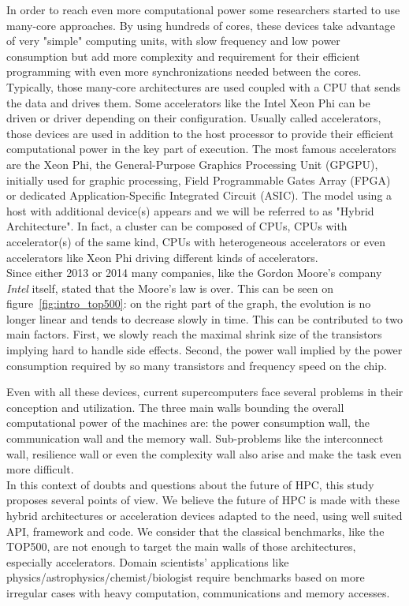 In order to reach even more computational power some researchers started to use many-core approaches. 
By using hundreds of cores, these devices take advantage of very "simple" computing units, with slow frequency and low power consumption but add more complexity and requirement for their efficient programming with even more synchronizations needed between the cores. 
Typically, those many-core architectures are used coupled with a CPU that sends the data and drives them.
Some accelerators like the Intel Xeon Phi can be driven or driver depending on their configuration. 
Usually called accelerators, those devices are used in addition to the host processor to provide their efficient computational power in the key part of execution. 
The most famous accelerators are the Xeon Phi, the General-Purpose Graphics Processing Unit (GPGPU), initially used for graphic processing, Field Programmable Gates Array (FPGA) or dedicated Application-Specific Integrated Circuit (ASIC).
The model using a host with additional device(s) appears and we will be referred to as "Hybrid Architecture".
In fact, a cluster can be composed of CPUs, CPUs with accelerator(s) of the same kind, CPUs with heterogeneous accelerators or even accelerators like Xeon Phi driving different kinds of accelerators.\\

Since either 2013 or 2014 many companies, like the Gordon Moore's company \textit{Intel} itself, stated that the Moore's law is over. 
This can be seen on figure~\ref{fig:intro_top500}: on the right part of the graph, the evolution is no longer linear and tends to decrease slowly in time. 
This can be contributed to two main factors. 
First, we slowly reach the maximal shrink size of the transistors implying hard to handle side effects. 
Second, the power wall implied by the power consumption required by so many transistors and frequency speed on the chip.

Even with all these devices, current supercomputers face several problems in their conception and utilization. 
The three main walls bounding the overall computational power of the machines are: the power consumption wall, the communication wall and the memory wall.  
Sub-problems like the interconnect wall, resilience wall or even the complexity wall also arise and make the task even more difficult.\\

In this context of doubts and questions about the future of HPC, this study proposes several points of view. 
We believe the future of HPC is made with these hybrid architectures or acceleration devices adapted to the need, using well suited API, framework and code.
We consider that the classical benchmarks, like the TOP500, are not enough to target the main walls of those architectures, especially accelerators. 
Domain scientists’ applications like physics/astrophysics/chemist/biologist require benchmarks based on more irregular cases with heavy computation, communications and memory accesses. 

